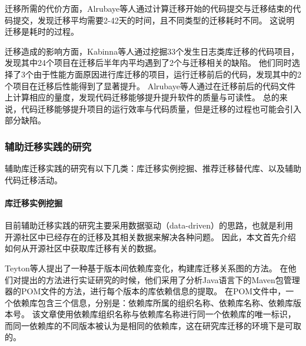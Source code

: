 \documentclass[UTF8]{ctexart}
\begin{document}
迁移所需的代价方面，Alrubaye等人\cite{2019ICPC-Alrubaye-On}通过计算迁移开始的代码提交与迁移结束的代码提交，发现迁移平均需要2-42天的时间，且不同类型的迁移耗时不同。
这说明迁移是耗时的过程。

迁移造成的影响方面，Kabinna等人\cite{2016MSR-Kabinna-Logging}通过挖掘33个发生日志类库迁移的代码项目，发现其中24个项目在迁移后半年内平均遇到了2个与迁移相关的缺陷。
他们同时选择了3个由于性能方面原因进行库迁移的项目，运行迁移前后的代码，发现其中的2个项目在迁移后性能得到了显著提升。
Alrubaye等人\cite{2019Arxiv-Alrubaye-How}通过在迁移前后的代码文件上计算相应的量度，发现代码迁移能够提升提升软件的质量与可读性。
总的来说，代码迁移能够提升项目的运行效率与代码质量，但是迁移的过程也可能会引入部分缺陷。







\subsubsection{辅助迁移实践的研究}

辅助库迁移实践的研究有以下几类：库迁移实例挖掘、推荐迁移替代库、以及辅助代码迁移活动。



\paragraph{库迁移实例挖掘}
目前辅助迁移实践的研究主要采用数据驱动（data-driven）的思路，也就是利用开源社区中已经存在的迁移及其相关数据来解决各种问题。
因此，本文首先介绍如何从开源社区中获取库迁移有关的数据。

Teyton等人\cite{2012WCRE-Teyton-Mining}提出了一种基于版本间依赖库变化，构建库迁移关系图的方法。
在他们对提出的方法进行实证研究的时候，他们采用了分析Java语言下的Maven包管理器的POM文件的方法，进行每个版本的库依赖信息的提取。
在POM文件中，一个依赖库包含三个信息，分别是：依赖库所属的组织名称、依赖库名称、依赖库版本号。
该文章使用依赖库组织名称与依赖库名称进行同一个依赖库的唯一标识，而同一依赖库的不同版本被认为是相同的依赖库，这在研究库迁移的环境下是可取的。
\end{document}
